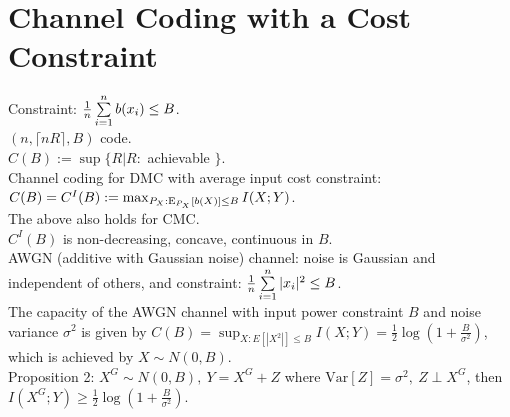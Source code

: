 \section{Channel Coding with a Cost Constraint}

Constraint: $\frac1n\sum\limits_{i=1}^nb(x_i)\leq B$.\\
$(n, \lceil nR\rceil, B)$ code.\\
$C(B):=\sup\{R|R:$ achievable $\}$.\\
Channel coding for DMC with average input cost constraint: $C(B)=C^I(B):=\max_{P_X: \mathrm{E}_{P_X}[b(X)]\leq B}I(X; Y)$.\\
The above also holds for CMC.\\
$C^I(B)$ is non-decreasing, concave, continuous in $B$.\\
AWGN (additive with Gaussian noise) channel: noise is Gaussian and independent of others, and constraint: $\frac1n\sum\limits_{i=1}^n|x_i|^2\leq B$.\\
The capacity of the AWGN channel with input power constraint $B$ and noise variance $\sigma^2$ is given by $C(B)=\sup_{X:E[|X^2|]\leq B}I(X; Y)=\frac12\log(1+\frac B{\sigma^2})$, which is achieved by $X\sim N(0, B)$.\\
Proposition 2: $X^G\sim N(0, B),\ Y=X^G+Z$ where $\mathrm{Var}[Z]=\sigma^2,\ Z\perp X^G$, then $I(X^G; Y)\geq\frac12\log(1+\frac B{\sigma^2})$.
